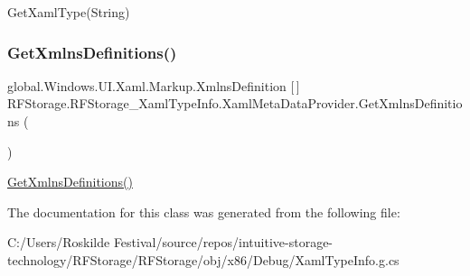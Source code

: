Get\+Xaml\+Type(\+String) 

\mbox{\label{class_r_f_storage_1_1_r_f_storage___xaml_type_info_1_1_xaml_meta_data_provider_a53c3df7eda4ba7894e70994c690fc945}} 
\subsubsection{\texorpdfstring{GetXmlnsDefinitions()}{GetXmlnsDefinitions()}}
{\footnotesize\ttfamily global.\+Windows.\+U\+I.\+Xaml.\+Markup.\+Xmlns\+Definition \mbox{[}$\,$\mbox{]} R\+F\+Storage.\+R\+F\+Storage\+\_\+\+Xaml\+Type\+Info.\+Xaml\+Meta\+Data\+Provider.\+Get\+Xmlns\+Definitions (\begin{DoxyParamCaption}{ }\end{DoxyParamCaption})}



\mbox{\hyperlink{class_r_f_storage_1_1_r_f_storage___xaml_type_info_1_1_xaml_meta_data_provider_a53c3df7eda4ba7894e70994c690fc945}{Get\+Xmlns\+Definitions()}} 



The documentation for this class was generated from the following file\+:\begin{DoxyCompactItemize}
\item 
C\+:/\+Users/\+Roskilde Festival/source/repos/intuitive-\/storage-\/technology/\+R\+F\+Storage/\+R\+F\+Storage/obj/x86/\+Debug/Xaml\+Type\+Info.\+g.\+cs\end{DoxyCompactItemize}
